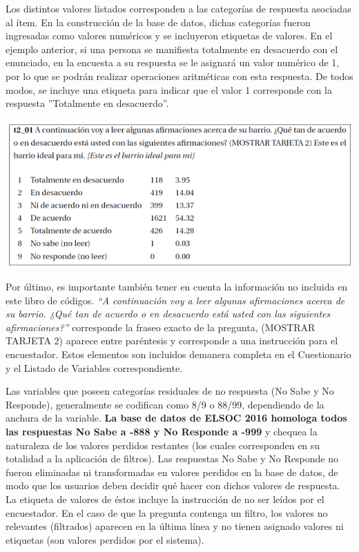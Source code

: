 \documentclass[
]{book}
\begin{document}
Los distintos valores listados corresponden a las categorías de respuesta asociadas al ítem. En la construcción de la base de datos, dichas categorías fueron ingresadas como valores numéricos y se incluyeron etiquetas de valores. En el ejemplo anterior, si una persona se manifiesta totalmente en desacuerdo con el enunciado, en la encuesta a su respuesta se le asignará un valor numérico de 1, por lo que se podrán realizar operaciones aritméticas con esta respuesta. De todos modos, se incluye una etiqueta para indicar que el valor 1 corresponde con la respuesta ''Totalmente en desacuerdo''.

\begin{center}\includegraphics[width=0.9\linewidth,height=0.9\textheight]{imagenes/t2_01} \end{center}

Por último, es importante también tener en cuenta la información no incluida en este libro de códigos. \emph{``A continuación voy a leer algunas afirmaciones acerca de su barrio. ¿Qué tan de acuerdo o en desacuerdo está usted con las siguientes afirmaciones?''} corresponde la fraseo exacto de la pregunta, (MOSTRAR TARJETA 2) aparece entre paréntesis y corresponde a una instrucción para el encuestador. Estos elementos son incluidos demanera completa en el Cuestionario y el Listado de Variables correspondiente.

Las variables que poseen categorías residuales de no respuesta (No Sabe y No Responde), generalmente se codifican como 8/9 o 88/99, dependiendo de la anchura de la variable. \textbf{La base de datos de ELSOC 2016 homologa todos las respuestas No Sabe a -888 y No Responde a -999} y chequea la naturaleza de los valores perdidos restantes (los cuales corresponden en su totalidad a la aplicación de filtros). Las respuestas No Sabe y No Responde no fueron eliminadas ni transformadas en valores perdidos en la base de datos, de modo que los usuarios deben decidir qué hacer con dichos valores de respuesta. La etiqueta de valores de éstos incluye la instrucción de no ser leídos por el encuestador. En el caso de que la pregunta contenga un filtro, los valores no relevantes (filtrados) aparecen en la última línea y no tienen asignado valores ni etiquetas (son valores perdidos por el sistema).
\end{document}
